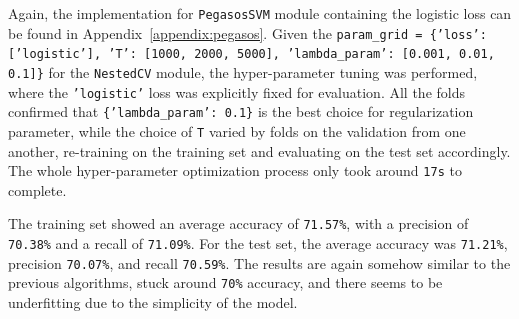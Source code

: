 Again, the implementation for \texttt{PegasosSVM} module containing the logistic loss can be found in Appendix~\ref{appendix:pegasos}. Given the \texttt{param\_grid = \{'loss': ['logistic'], 'T': [1000, 2000, 5000], 'lambda\_param': [0.001, 0.01, 0.1]\}} for the \texttt{NestedCV} module, the hyper-parameter tuning was performed, where the \texttt{'logistic'} loss was explicitly fixed for evaluation. All the folds confirmed that \texttt{\{'lambda\_param': 0.1\}} is the best choice for regularization parameter, while the choice of \texttt{T} varied by folds on the validation from one another, re-training on the training set and evaluating on the test set accordingly. The whole hyper-parameter optimization process only took around \texttt{17s} to complete.

The training set showed an average accuracy of \texttt{71.57\%}, with a precision of \texttt{70.38\%} and a recall of \texttt{71.09\%}. For the test set, the average accuracy was \texttt{71.21\%}, precision \texttt{70.07\%}, and recall \texttt{70.59\%}. The results are again somehow similar to the previous algorithms, stuck around \texttt{70\%} accuracy, and there seems to be underfitting due to the simplicity of the model.